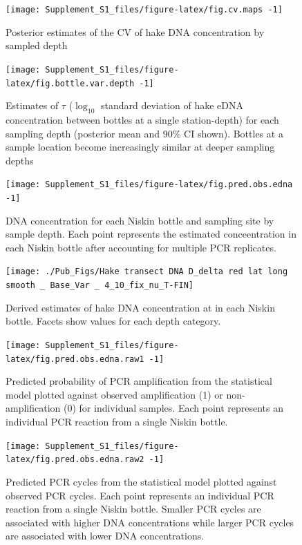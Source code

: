 \documentclass[
]{article}
\begin{document}
\begin{figure}
\texttt{[image: Supplement\_S1\_files/figure-latex/fig.cv.maps -1]} \caption{\label{fig:cv.maps} Posterior estimates of the CV of hake DNA concentration by sampled depth}\label{fig:fig.cv.maps }
\end{figure}

\begin{figure}
\texttt{[image: Supplement\_S1\_files/figure-latex/fig.bottle.var.depth -1]} \caption{\label{fig:bottle.var.depth} Estimates of \(\tau\) (\(\log_{10}\) standard deviation of hake eDNA concentration between bottles at a single station-depth) for each sampling depth (posterior mean and 90\% CI shown). Bottles at a sample location become increasingly similar at deeper sampling depths }\label{fig:fig.bottle.var.depth }
\end{figure}

\begin{figure}
\texttt{[image: Supplement\_S1\_files/figure-latex/fig.pred.obs.edna -1]} \caption{\label{fig:pred.obs.edna} DNA concentration for each Niskin bottle and sampling site by sample depth. Each point represents the estimated conceentration in each Niskin bottle after accounting for multiple PCR replicates.}\label{fig:fig.pred.obs.edna }
\end{figure}

\begin{figure}
\texttt{[image: ./Pub\_Figs/Hake transect DNA D\_delta red lat long smooth \_ Base\_Var \_ 4\_10\_fix\_nu\_T-FIN]} \caption{\label{fig:red.delta} Derived estimates of hake DNA concentration at in each Niskin bottle.  Facets show values for each depth category. }\label{fig:fig.red.delta }
\end{figure}

\begin{figure}
\texttt{[image: Supplement\_S1\_files/figure-latex/fig.pred.obs.edna.raw1 -1]} \caption{\label{fig:pred.obs.edna.raw1} Predicted probability of PCR amplification from the statistical model plotted against observed amplification (1) or non-amplification (0) for individual samples. Each point represents an individual PCR reaction from a single Niskin bottle.}\label{fig:fig.pred.obs.edna.raw1 }
\end{figure}

\begin{figure}
\texttt{[image: Supplement\_S1\_files/figure-latex/fig.pred.obs.edna.raw2 -1]} \caption{\label{fig:pred.obs.edna.raw2} Predicted PCR cycles from the statistical model plotted against observed PCR cycles. Each point represents an individual PCR reaction from a single Niskin bottle. Smaller PCR cycles are associated with higher DNA concentrations while larger PCR cycles are associated with lower DNA concentrations.}\label{fig:fig.pred.obs.edna.raw2 }
\end{figure}
\end{document}
